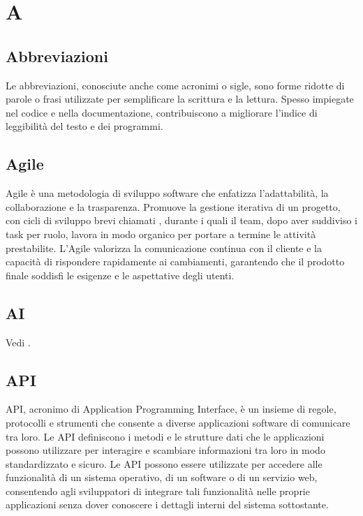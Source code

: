 \section{A}

\vspace{2em}
\subsection*{Abbreviazioni}
\par Le abbreviazioni, conosciute anche come acronimi o sigle, sono forme ridotte di parole o frasi utilizzate per semplificare la scrittura e la lettura. Spesso impiegate nel codice e nella documentazione, contribuiscono a migliorare l'indice di leggibilità del testo e dei programmi.

\vspace{2em}
\subsection*{Agile}
\par Agile è una metodologia di sviluppo software che enfatizza l'adattabilità, la collaborazione e la trasparenza. Promuove la gestione iterativa di un progetto, con cicli di sviluppo brevi chiamati , durante i quali il team, dopo aver suddiviso i task per ruolo, lavora in modo organico per portare a termine le attività prestabilite. L'Agile valorizza la comunicazione continua con il cliente e la capacità di rispondere rapidamente ai cambiamenti, garantendo che il prodotto finale soddisfi le esigenze e le aspettative degli utenti.

\vspace{2em}
\subsection*{AI}
\par Vedi .

\vspace{2em}
\subsection*{API}
\par API, acronimo di Application Programming Interface, è un insieme di regole, protocolli e strumenti che consente a diverse applicazioni software di comunicare tra loro. Le API definiscono i metodi e le strutture dati che le applicazioni possono utilizzare per interagire e scambiare informazioni tra loro in modo standardizzato e sicuro. Le API possono essere utilizzate per accedere alle funzionalità di un sistema operativo, di un software o di un servizio web, consentendo agli sviluppatori di integrare tali funzionalità nelle proprie applicazioni senza dover conoscere i dettagli interni del sistema sottostante.

